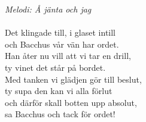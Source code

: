 {\footnotesize\textit{Melodi: Å jänta och jag}}\\
\\
Det klingade till, i glaset intill\\
och Bacchus vår vän har ordet.\\
Han åter nu vill att vi tar en drill,\\
ty vinet det står på bordet.\\
Med tanken vi glädjen gör till beslut,\\
ty supa den kan vi alla förlut\\
och därför skall botten upp absolut,\\
sa Bacchus och tack för ordet!
